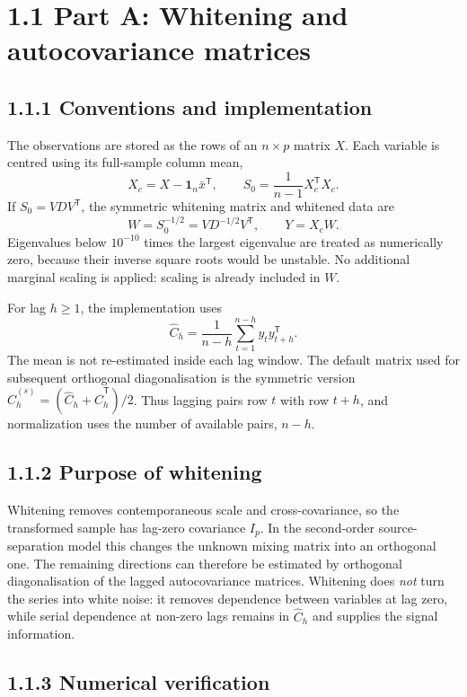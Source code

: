 \documentclass[11pt,a4paper]{article}
\begin{document}
\section*{1.1 Part A: Whitening and autocovariance matrices}

\subsection*{1.1.1 Conventions and implementation}

The observations are stored as the rows of an $n\times p$ matrix $X$.  Each variable is
centred using its full-sample column mean,
\[
  X_c=X-\mathbf{1}_n\bar{x}^{\mathsf T},
  \qquad
  S_0=\frac{1}{n-1}X_c^{\mathsf T}X_c.
\]
If $S_0=VDV^{\mathsf T}$, the symmetric whitening matrix and whitened data are
\[
  W=S_0^{-1/2}=VD^{-1/2}V^{\mathsf T},
  \qquad Y=X_cW.
\]
Eigenvalues below $10^{-10}$ times the largest eigenvalue are treated as numerically zero,
because their inverse square roots would be unstable.  No additional marginal scaling is
applied: scaling is already included in $W$.

For lag $h\geq1$, the implementation uses
\[
  \widehat C_h
  =\frac{1}{n-h}\sum_{t=1}^{n-h}y_ty_{t+h}^{\mathsf T}.
\]
The mean is not re-estimated inside each lag window.  The default matrix used for subsequent
orthogonal diagonalisation is the symmetric version
$\widehat C_h^{(s)}=(\widehat C_h+\widehat C_h^{\mathsf T})/2$.  Thus lagging pairs row $t$
with row $t+h$, and normalization uses the number of available pairs, $n-h$.

\subsection*{1.1.2 Purpose of whitening}

Whitening removes contemporaneous scale and cross-covariance, so the transformed sample has
lag-zero covariance $I_p$.  In the second-order source-separation model this changes the
unknown mixing matrix into an orthogonal one.  The remaining directions can therefore be
estimated by orthogonal diagonalisation of the lagged autocovariance matrices.  Whitening
does \emph{not} turn the series into white noise: it removes dependence between variables at
lag zero, while serial dependence at non-zero lags remains in $\widehat C_h$ and supplies the
signal information.

\subsection*{1.1.3 Numerical verification}
\end{document}
